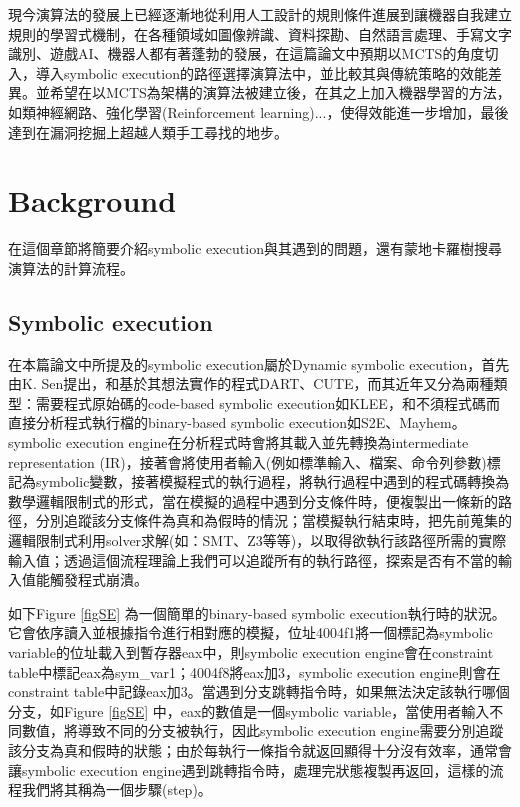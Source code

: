 \documentclass[12pt,a4paper,oneside]{book}
\begin{document}
現今演算法的發展上已經逐漸地從利用人工設計的規則條件進展到讓機器自我建立規則的學習式機制，在各種領域如圖像辨識、資料探勘、自然語言處理、手寫文字識別、遊戲AI、機器人都有著蓬勃的發展，在這篇論文中預期以MCTS的角度切入，導入symbolic execution的路徑選擇演算法中，並比較其與傳統策略的效能差異。並希望在以MCTS為架構的演算法被建立後，在其之上加入機器學習的方法，如類神經網路、強化學習(Reinforcement learning)...，使得效能進一步增加，最後達到在漏洞挖掘上超越人類手工尋找的地步。





\chapter{Background}

在這個章節將簡要介紹symbolic execution與其遇到的問題，還有蒙地卡羅樹搜尋演算法的計算流程。

\section{Symbolic execution}

在本篇論文中所提及的symbolic execution屬於Dynamic symbolic execution，首先由K. Sen\cite{sen2007concolic}提出，和基於其想法實作的程式DART\cite{godefroid2005dart}、CUTE\cite{sen2005cute}，而其近年又分為兩種類型：需要程式原始碼的code-based symbolic execution如KLEE\cite{cadar2008klee}，和不須程式碼而直接分析程式執行檔的binary-based symbolic execution如S2E\cite{chipounov2012s2e}、Mayhem\cite{cha2012mayhem}。symbolic execution engine在分析程式時會將其載入並先轉換為intermediate representation (IR)，接著會將使用者輸入(例如標準輸入、檔案、命令列參數)標記為symbolic變數，接著模擬程式的執行過程，將執行過程中遇到的程式碼轉換為數學邏輯限制式的形式，當在模擬的過程中遇到分支條件時，便複製出一條新的路徑，分別追蹤該分支條件為真和為假時的情況；當模擬執行結束時，把先前蒐集的邏輯限制式利用solver求解(如：SMT\cite{vanegue2012smt}、Z3\cite{Z3}等等)，以取得欲執行該路徑所需的實際輸入值；透過這個流程理論上我們可以追蹤所有的執行路徑，探索是否有不當的輸入值能觸發程式崩潰。

如下Figure \ref{figSE} 為一個簡單的binary-based symbolic execution執行時的狀況。它會依序讀入並根據指令進行相對應的模擬，位址4004f1將一個標記為symbolic variable的位址載入到暫存器eax中，則symbolic execution engine會在constraint table中標記eax為sym\_var1；4004f8將eax加3，symbolic execution engine則會在constraint table中記錄eax加3。當遇到分支跳轉指令時，如果無法決定該執行哪個分支，如Figure \ref{figSE} 中，eax的數值是一個symbolic variable，當使用者輸入不同數值，將導致不同的分支被執行，因此symbolic execution engine需要分別追蹤該分支為真和假時的狀態；由於每執行一條指令就返回顯得十分沒有效率，通常會讓symbolic execution engine遇到跳轉指令時，處理完狀態複製再返回，這樣的流程我們將其稱為一個步驟(step)。
\end{document}
